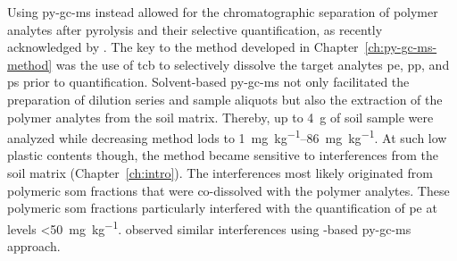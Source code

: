 Using \ac{py-gc-ms} instead allowed for the chromatographic separation of polymer analytes after pyrolysis and their selective quantification, as recently acknowledged by \citet{Jimenez-SkrzypekCurrent2021}. The key to the method developed in Chapter~\ref{ch:py-gc-ms-method} was the use of \ac{tcb} to selectively dissolve the target analytes \ac{pe}, \ac{pp}, and \ac{ps} prior to quantification. Solvent-based \ac{py-gc-ms} not only facilitated the preparation of dilution series and sample aliquots but also the extraction of the polymer analytes from the soil matrix. Thereby, up to \SI{4}{\gram} of soil sample were analyzed while decreasing method \acp{lod} to \SIrange{1}{86}{\milli\gram\per\kilo\gram}.
At such low plastic contents though, the method became sensitive to interferences from the soil matrix (Chapter~\ref{ch:intro}). The interferences most likely originated from polymeric \ac{som} fractions that were co-dissolved with the polymer analytes. These polymeric \ac{som} fractions particularly interfered with the quantification of \ac{pe} at levels \SI{<50}{\milli\gram\per\kilo\gram}.  observed similar interferences using -based \ac{py-gc-ms} approach.

